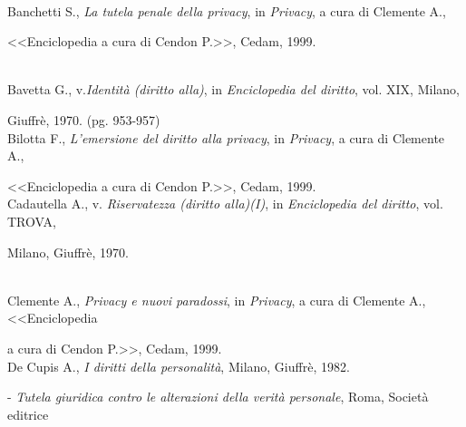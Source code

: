 
\\Banchetti S., \textit{La tutela penale della privacy}, in \textit{Privacy}, a cura di Clemente A.,

<<Enciclopedia a cura di Cendon P.>>, Cedam, 1999.

\\Bavetta G., v.\textit{Identità (diritto alla)}, in \textit{Enciclopedia del diritto}, vol. XIX, Milano,

Giuffrè, 1970. (pg. 953-957)
\\Bilotta F., \textit{L’emersione del diritto alla privacy}, in \textit{Privacy}, a cura di Clemente A.,

<<Enciclopedia a cura di Cendon P.>>, Cedam, 1999.
\\Cadautella A., v. \textit{Riservatezza (diritto alla)(I)}, in \textit{Enciclopedia del diritto}, vol. TROVA,

Milano, Giuffrè, 1970. 






\\Clemente A., \textit{Privacy e nuovi paradossi}, in \textit{Privacy}, a cura di Clemente A.,<<Enciclopedia 

a cura di Cendon P.>>, Cedam, 1999.
\\De Cupis A., \textit{I diritti della personalità}, Milano, Giuffrè, 1982.

-   \textit{Tutela giuridica contro le alterazioni della verità personale}, Roma, Società editrice

